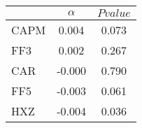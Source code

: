\begin{tabular}{lcc}
\toprule
 & $\alpha$ & $Pvalue$ \\
\midrule
CAPM & 0.004 & 0.073 \\
FF3 & 0.002 & 0.267 \\
CAR & -0.000 & 0.790 \\
FF5 & -0.003 & 0.061 \\
HXZ & -0.004 & 0.036 \\
\bottomrule
\end{tabular}
